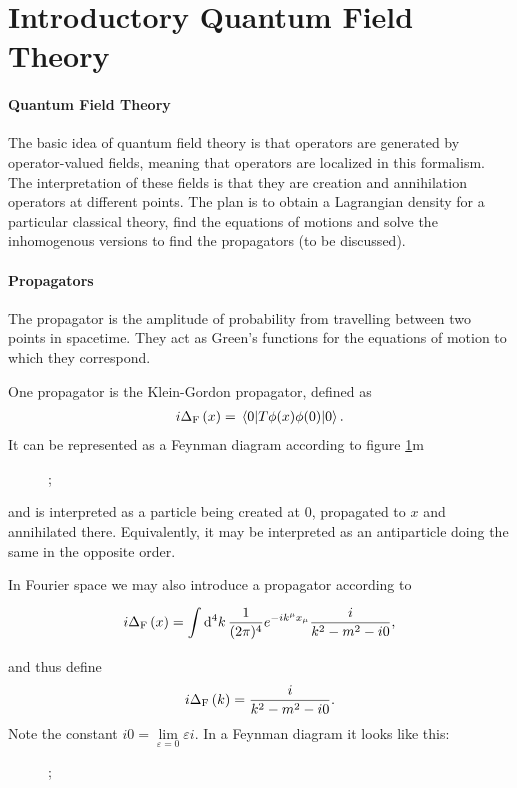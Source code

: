 \section{Introductory Quantum Field Theory}

\paragraph{Quantum Field Theory}
The basic idea of quantum field theory is that operators are generated by operator-valued fields, meaning that operators are localized in this formalism. The interpretation of these fields is that they are creation and annihilation operators at different points. The plan is to obtain a Lagrangian density for a particular classical theory, find the equations of motions and solve the inhomogenous versions to find the propagators (to be discussed).

\paragraph{Propagators}
The propagator is the amplitude of probability from travelling between two points in spacetime. They act as Green's functions for the equations of motion to which they correspond.

One propagator is the Klein-Gordon propagator, defined as
\begin{align*}
i\Delta_{\text{F}}\left(x\right) = \expval{\ensuremath{T}{\phi(x)}{\phi(0)}}{0}.
\end{align*}
It can be represented as a Feynman diagram according to figure \ref{fig:kgprop}m
\begin{figure}[!ht]
	\centering
	;
	\label{fig:kgprop}
\end{figure}
and is interpreted as a particle being created at $0$, propagated to $x$ and annihilated there. Equivalently, it may be interpreted as an antiparticle doing the same in the opposite order.

In Fourier space we may also introduce a propagator according to
\begin{align*}
	i\Delta_{\text{F}}\left(x\right) = \int\limits_{}^{}\dd[4]{k}\frac{1}{(2\pi)^{4}}e^{-ik^{\mu}x_{\mu}}\frac{i}{k^{2} - m^{2} - i0},
\end{align*}
and thus define
\begin{align*}
i\Delta_{\text{F}}\left(k\right) = \frac{i}{k^{2} - m^{2} - i0}.
\end{align*}
Note the constant $i0 = \lim\limits_{\varepsilon = 0}\varepsilon i$. In a Feynman diagram it looks like this:
\begin{figure}[!ht]
	\centering
	;
\end{figure}

